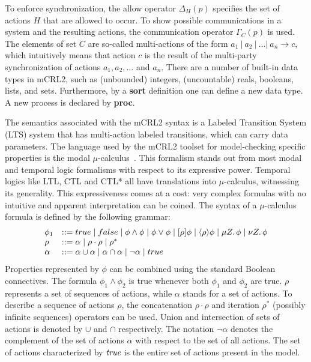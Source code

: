 \documentclass[letter]{llncs}
\begin{document}
To enforce synchronization, the allow operator ${\Delta_H(p)}$ specifies the set of actions $H$ that are allowed
to occur. To show possible communications in a system and the resulting actions, the communication operator
${\Gamma_C(p)}$ is used. The elements of set $C$ are so-called multi-actions of the form $a_1\ |\ a_2\ |\ \dots |\ a_n \rightarrow c$, which intuitively
means that action $c$ is the result of the multi-party synchronization of actions $a_1 , a_2 , \dots $ and $a_n$.
There are a number of built-in data types in mCRL2, such as (unbounded) integers, (uncountable)
reals, booleans, lists, and sets. 
Furthermore, by a \textbf{sort} definition one can define a new data type. A new process
is declared by \textbf{proc}.

The semantics associated with the mCRL2 syntax is a Labeled Transition System (LTS)
system that has multi-action labeled transitions, which can carry data parameters. The language used by the mCRL2
toolset for model-checking specific properties is the modal
$\mu$-calculus~\cite{Emerson97modelchecking}. This formalism stands out from most modal and temporal logic formalisms with respect to its
expressive power. Temporal logics like LTL, CTL and CTL* all have translations into $\mu$-calculus,
witnessing its generality. This expressiveness comes at a cost: very complex formulas with no intuitive and apparent interpretation can be coined. 
The syntax of a $\mu$-calculus formula is defined by the following grammar:
\[
\begin{array}{ll}

\phi_1 & ::= true \mid false \mid \phi\wedge\phi \mid \phi\vee\phi \mid [\rho]\phi \mid \langle\rho\rangle\phi \mid \mu Z\ldotp\phi \mid \nu Z\ldotp\phi \\
\rho & ::= \alpha \mid \rho\cdot\rho \mid \rho^* \\
\alpha & ::= \alpha\cup\alpha \mid \alpha\cap\alpha \mid\neg\alpha \mid true\\
\end{array}
\]
Properties represented by $\phi$ can be combined using the standard Boolean connectives.
The formula $\phi_1\wedge\phi_2$ is true whenever both $\phi_1$ and $\phi_2$ are true.
$\rho$ represents a set of sequences of actions, while $\alpha$ stands for a set of actions.
To describe a sequence of actions $\rho$, the concatenation $\rho\cdot\rho$ and iteration $\rho^*$ (possibly infinite sequences) operators can be used.
Union and intersection of sets of actions is denoted by $\cup$ and $\cap$ respectively. 
The notation $\neg\alpha$ denotes the complement of the set of actions $\alpha$ with respect to the set of all actions. 
The set of actions characterized by $\emph{true}$ is the entire set of actions present in the model.
\end{document}
